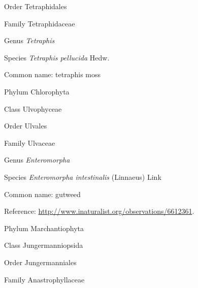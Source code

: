 \documentclass[9pt, article]{memoir}
\begin{document}
\begin{multicols}{2}
\vspace{6pt}\noindent\hspace{18pt}Order Tetraphidales


\vspace{6pt}\noindent\hspace{24pt}Family Tetraphidaceae


\vspace{6pt}\noindent\hspace{30pt}Genus \textit{Tetraphis}


\vspace{6pt}\noindent\hspace{36pt}Species \textit{Tetraphis pellucida} Hedw.


Common name: tetraphis moss

\vspace{6pt}\noindent\hspace{6pt}Phylum Chlorophyta


\vspace{6pt}\noindent\hspace{12pt}Class Ulvophyceae


\vspace{6pt}\noindent\hspace{18pt}Order Ulvales


\vspace{6pt}\noindent\hspace{24pt}Family Ulvaceae


\vspace{6pt}\noindent\hspace{30pt}Genus \textit{Enteromorpha}


\vspace{6pt}\noindent\hspace{36pt}Species \textit{Enteromorpha intestinalis} (Linnaeus) Link


Common name: gutweed

Reference: 
\url{http://www.inaturalist.org/observations/6612361}.

\vspace{6pt}\noindent\hspace{6pt}Phylum Marchantiophyta


\vspace{6pt}\noindent\hspace{12pt}Class Jungermanniopsida


\vspace{6pt}\noindent\hspace{18pt}Order Jungermanniales


\vspace{6pt}\noindent\hspace{24pt}Family Anastrophyllaceae



\end{multicols}
\end{document}
